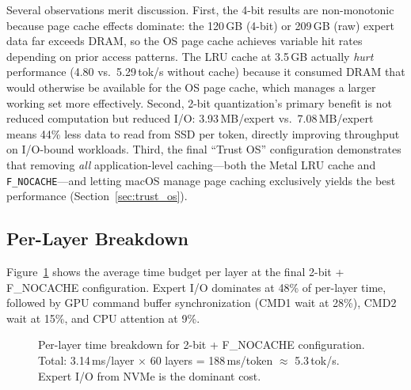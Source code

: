 \documentclass[11pt,twocolumn]{article}
\begin{document}
Several observations merit discussion.
First, the 4-bit results are non-monotonic because page cache effects dominate: the 120\,GB (4-bit) or 209\,GB (raw) expert data far exceeds DRAM, so the OS page cache achieves variable hit rates depending on prior access patterns.
The LRU cache at 3.5\,GB actually \emph{hurt} performance (4.80 vs.\ 5.29\,tok/s without cache) because it consumed DRAM that would otherwise be available for the OS page cache, which manages a larger working set more effectively.
Second, 2-bit quantization's primary benefit is not reduced computation but reduced I/O: 3.93\,MB/expert vs.\ 7.08\,MB/expert means 44\% less data to read from SSD per token, directly improving throughput on I/O-bound workloads.
Third, the final ``Trust OS'' configuration demonstrates that removing \emph{all} application-level caching---both the Metal LRU cache and \texttt{F\_NOCACHE}---and letting macOS manage page caching exclusively yields the best performance (Section~\ref{sec:trust_os}).

\subsection{Per-Layer Breakdown}

Figure~\ref{fig:breakdown} shows the average time budget per layer at the final 2-bit + F\_NOCACHE configuration.
Expert I/O dominates at 48\% of per-layer time, followed by GPU command buffer synchronization (CMD1 wait at 28\%), CMD2 wait at 15\%, and CPU attention at 9\%.

\begin{figure}[t]
\centering
{}
\caption{Per-layer time breakdown for 2-bit + F\_NOCACHE configuration. Total: 3.14\,ms/layer $\times$ 60 layers = 188\,ms/token $\approx$ 5.3\,tok/s. Expert I/O from NVMe is the dominant cost.}
\label{fig:breakdown}
\end{figure}
\end{document}
